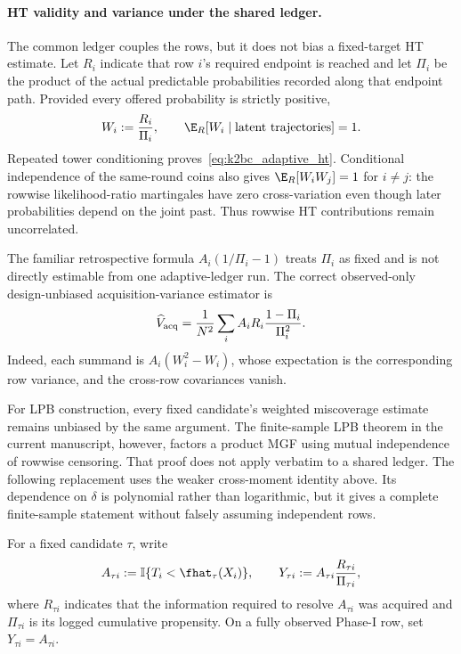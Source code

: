 \paragraph{HT validity and variance under the shared ledger.}
The common ledger couples the rows, but it does not bias a fixed-target HT
estimate.  Let $R_i$ indicate that row $i$'s required endpoint is reached and
let $\Pi_i$ be the product of the actual predictable probabilities recorded
along that endpoint path.  Provided every offered probability is strictly
positive,
\begin{equation}
 W_i:=\frac{R_i}{\Pi_i},
 \qquad
 \E_R[W_i\mid\text{latent trajectories}]=1.
 \label{eq:k2bc_adaptive_ht}
\end{equation}
Repeated tower conditioning proves~\eqref{eq:k2bc_adaptive_ht}.  Conditional
independence of the same-round coins also gives
$\E_R[W_iW_j]=1$ for $i\ne j$: the rowwise likelihood-ratio martingales have
zero cross-variation even though later probabilities depend on the joint past.
Thus rowwise HT contributions remain uncorrelated.

The familiar retrospective formula $A_i(1/\Pi_i-1)$ treats $\Pi_i$ as fixed
and is not directly estimable from one adaptive-ledger run.  The correct
observed-only design-unbiased acquisition-variance estimator is
\begin{equation}
 \widehat V_{\rm acq}
 =\frac{1}{N^2}\sum_i A_iR_i
   \frac{1-\Pi_i}{\Pi_i^2}.
 \label{eq:k2bc_online_variance}
\end{equation}
Indeed, each summand is $A_i(W_i^2-W_i)$, whose expectation is the
corresponding row variance, and the cross-row covariances vanish.

For LPB construction, every fixed candidate's weighted miscoverage estimate
remains unbiased by the same argument.  The finite-sample LPB theorem in the
current manuscript, however, factors a product MGF using mutual independence
of rowwise censoring.  That proof does not apply verbatim to a shared ledger.
The following replacement uses the weaker cross-moment identity above.  Its
dependence on $\delta$ is polynomial rather than logarithmic, but it gives a
complete finite-sample statement without falsely assuming independent rows.

For a fixed candidate $\tau$, write
\begin{equation}
 A_{\tau i}:=\mathbb{I}\{T_i<\fhat_\tau(X_i)\},\qquad
 Y_{\tau i}:=A_{\tau i}\frac{R_{\tau i}}{\Pi_{\tau i}},
 \label{eq:k2bc_lpb_ht_row}
\end{equation}
where $R_{\tau i}$ indicates that the information required to resolve
$A_{\tau i}$ was acquired and $\Pi_{\tau i}$ is its logged cumulative
propensity.  On a fully observed Phase-I row, set $Y_{\tau i}=A_{\tau i}$.

